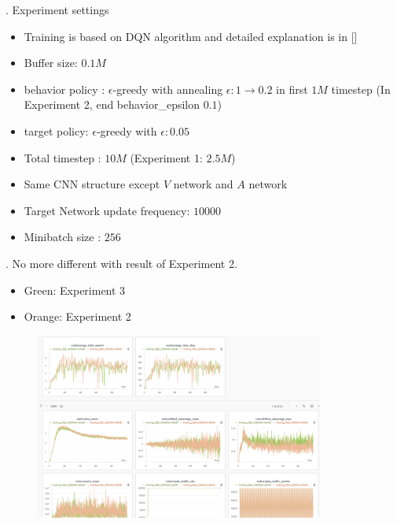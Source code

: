 \documentclass[8pt]{beamer}
\begin{document}
\begin{frame}{.}
    Experiment settings
    \begin{itemize}
        \item Training is based on DQN algorithm and detailed explanation is in [\cite{mnih2015human}]
        \item Buffer size: $0.1M$
        \item behavior policy : $\epsilon$-greedy with annealing $\epsilon : 1 \rightarrow 0.2$ in first $1M$ timestep (In Experiment 2, end behavior\_epsilon $0.1$)
        \item target policy: $\epsilon$-greedy with $\epsilon: 0.05$
        \item Total timestep : $10M$ (Experiment 1: $2.5M$)
        \item Same CNN structure except $V$ network and $A$ network
        \item Target Network update frequency: $10000$
        \item Minibatch size : $256$
    \end{itemize}
\end{frame}

\begin{frame}{.}
    No more different with result of Experiment 2.

    \begin{itemize}
        \item Green: Experiment 3
        \item Orange: Experiment 2
    \end{itemize}

    \begin{figure}
        \includegraphics[width=0.85\textwidth]{Exp3_1.png}
    \end{figure}
\end{frame}
\end{document}
